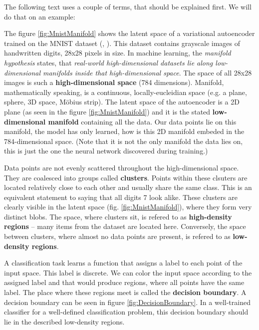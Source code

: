 \qquad

The following text uses a couple of terms, that should be explained first. We will do that on an example:

The figure \ref{fig:MnistManifold} shows the latent space of a variational autoencoder trained on the MNIST dataset (\cite{VariationalAutoencoder}, \cite{Mnist}). This dataset contains grayscale images of handwritten digits, 28x28 pixels in size. In machine learning, the \emph{manifold hypothesis} states, that \emph{real-world high-dimensional datasets lie along low-dimensional manifolds inside that high-dimensional space}. The space of all 28x28 images is such a \textbf{high-dimensional space} (784 dimensions). Manifold, mathematically speaking, is a continuous, locally-eucleidian space (e.g. a plane, sphere, 3D space, Möbius strip). The latent space of the autoencoder is a 2D plane (as seen in the figure \ref{fig:MnistManifold}) and it is the stated \textbf{low-dimensional manifold} containing all the data. Our data points lie on this manifold, the model has only learned, how is this 2D manifold embeded in the 784-dimensional space. (Note that it is not the only manifold the data lies on, this is just the one the neural network discovered during training.)

Data points are not evenly scattered throughout the high-dimensional space. They are coalesced into groups called \textbf{clusters}. Points within these clsuters are located relatively close to each other and usually share the same class. This is an equivalent statement to saying that all digits 7 look alike. These clusters are clearly visible in the latent space (fig. \ref{fig:MnistManifold}), where they form very distinct blobs. The space, where clusters sit, is refered to as \textbf{high-density regions} -- many items from the dataset are located here. Conversely, the space between clusters, where almost no data points are present, is refered to as \textbf{low-density regions}.

A classification task learns a function that assigns a label to each point of the input space. This label is discrete. We can color the input space according to the assigned label and that would produce regions, where all points have the same label. The place where these regions meet is called the \textbf{decision boundary}. A decision boundary can be seen in figure \ref{fig:DecisionBoundary}. In a well-trained classifier for a well-defined classification problem, this decision boundary should lie in the described low-density regions.


